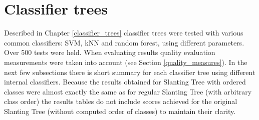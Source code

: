 \section{Classifier trees}

Described in Chapter \ref{classifier_trees} classifier trees were tested with various common classifiers: SVM, kNN and random forest, using different parameters. Over 500 tests were held. When evaluating results quality evaluation measurements were taken into account (see Section \ref{quality_measures}). In the next few subsections there is short summary for each classifier tree using different internal classifiers. Because the results obtained for Slanting Tree with ordered classes were almost exactly the same as for regular Slanting Tree (with arbitrary class order) the results tables do not include scores achieved for the original Slanting Tree (without computed order of classes) to maintain their clarity.

